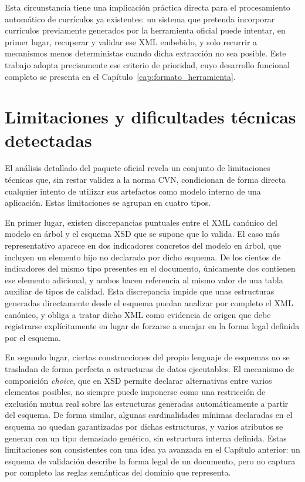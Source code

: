 Esta circunstancia tiene una implicación práctica directa para el procesamiento
automático de currículos ya existentes: un sistema que pretenda incorporar
currículos previamente generados por la herramienta oficial puede intentar, en
primer lugar, recuperar y validar ese XML embebido, y solo recurrir a mecanismos
menos deterministas cuando dicha extracción no sea posible. Este trabajo adopta
precisamente ese criterio de prioridad, cuyo desarrollo funcional completo se
presenta en el Capítulo~\ref{cap:formato_herramienta}.

\section{Limitaciones y dificultades técnicas detectadas}
\label{sec:ecosistema_limitaciones}

El análisis detallado del paquete oficial revela un conjunto de limitaciones
técnicas que, sin restar validez a la norma CVN, condicionan de forma directa
cualquier intento de utilizar sus artefactos como modelo interno de una
aplicación. Estas limitaciones se agrupan en cuatro tipos.

En primer lugar, existen discrepancias puntuales entre el XML canónico del
modelo en árbol y el esquema XSD que se supone que lo valida. El caso más
representativo aparece en dos indicadores concretos del modelo en árbol, que
incluyen un elemento hijo no declarado por dicho esquema. De los cientos de
indicadores del mismo tipo presentes en el documento, únicamente dos contienen
ese elemento adicional, y ambos hacen referencia al mismo valor de una tabla
auxiliar de tipos de calidad. Esta discrepancia impide que unas estructuras
generadas directamente desde el esquema puedan analizar por completo el XML
canónico, y obliga a tratar dicho XML como evidencia de origen que debe
registrarse explícitamente en lugar de forzarse a encajar en la forma legal
definida por el esquema.

En segundo lugar, ciertas construcciones del propio lenguaje de esquemas no se
trasladan de forma perfecta a estructuras de datos ejecutables. El mecanismo de
composición \textit{choice}, que en XSD permite declarar alternativas entre
varios elementos posibles, no siempre puede imponerse como una restricción de
exclusión mutua real sobre las estructuras generadas automáticamente a partir
del esquema. De forma similar, algunas cardinalidades mínimas declaradas en el
esquema no quedan garantizadas por dichas estructuras, y varios atributos se
generan con un tipo demasiado genérico, sin estructura interna definida. Estas
limitaciones son consistentes con una idea ya avanzada en el Capítulo
anterior: un esquema de validación describe la forma legal de un documento,
pero no captura por completo las reglas semánticas del dominio que representa.


